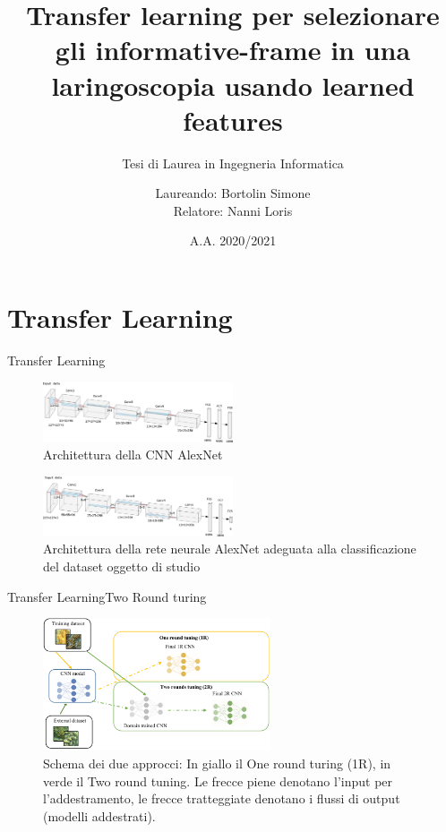 \documentclass[aspectratio=169]{beamer}
\title{Transfer learning per selezionare gli informative-frame in una laringoscopia usando learned features}
\subtitle{Tesi di Laurea in Ingegneria Informatica}
\date{A.A. 2020/2021}
\author{Laureando: Bortolin Simone\\Relatore: Nanni Loris}
\begin{document}
\begin{frame}
    \maketitle
\end{frame}

\begin{frame}
            \tableofcontents
\end{frame}

\section{Transfer Learning}
\begin{frame}{Transfer Learning}
    \begin{figure}[ht]
        \centering
        \includegraphics[width=0.5\textwidth]{addestramento-rete-neurale/alexnet.pdf}
        \caption{Architettura della CNN AlexNet}
        \label{fig:alexnet}
    \end{figure}
    \begin{figure}[ht]
        \centering
        \includegraphics[width=0.5\textwidth]{addestramento-rete-neurale/alexnet-tl.pdf}
        \caption{Architettura della rete neurale AlexNet adeguata alla classificazione del dataset oggetto di studio}
        \label{fig:alexnet-tl}
    \end{figure}
\end{frame}

\begin{frame}{Transfer Learning}{Two Round turing}
    
\begin{figure}[ht]
    \centering
    \includegraphics[width=0.6\textwidth]{transfer-learning/tl_2rt.pdf}
    \caption[Schema dei due approcci: In giallo il One round turing (1R), in verde il Two round tuning]{Schema dei due approcci: In giallo il One round turing (1R), in verde il Two round tuning. Le frecce piene denotano l'input per l'addestramento, le frecce tratteggiate denotano i flussi di output (modelli addestrati).}
    \label{fig:tl_2rt}
\end{figure}
\end{frame}
\end{document}
